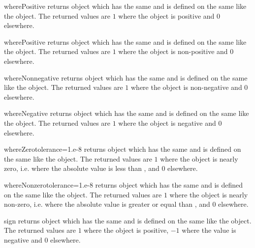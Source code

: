 \begin{methoddesc}[Data]{wherePositive}{}
returns \Data object which has the same \Shape and is defined on
the same \FunctionSpace like the object. The returned values are $1$
where the object is positive and $0$ elsewhere.
\end{methoddesc}

\begin{methoddesc}[Data]{wherePositive}{}
returns \Data object which has the same \Shape and is defined on
the same \FunctionSpace like the object. The returned values are $1$
where the object is non-positive and $0$ elsewhere.
\end{methoddesc}

\begin{methoddesc}[Data]{whereNonnegative}{}
returns \Data object which has the same \Shape and is defined on
the same \FunctionSpace like the object. The returned values are $1$
where the object is non-negative and $0$ elsewhere.
\end{methoddesc}

\begin{methoddesc}[Data]{whereNegative}{}
returns \Data object which has the same \Shape and is defined on
the same \FunctionSpace like the object. The returned values are $1$
where the object is negative and $0$ elsewhere.
\end{methoddesc}

\begin{methoddesc}[Data]{whereZero}{tolerance=1.e-8}
returns \Data object which has the same \Shape and is defined on
the same \FunctionSpace like the object. The returned values are $1$
where the object is nearly zero, i.e. where the absolute value is less
than , and $0$ elsewhere.
\end{methoddesc}

\begin{methoddesc}[Data]{whereNonzero}{tolerance=1.e-8}
returns \Data object which has the same \Shape and is defined on
the same \FunctionSpace like the object. The returned values are $1$
where the object is nearly non-zero, i.e. where the absolute value is
greater or equal than , and $0$ elsewhere.
\end{methoddesc}

\begin{methoddesc}[Data]{sign}{}
returns \Data object which has the same \Shape and is defined on
the same \FunctionSpace like the object. The returned values are $1$
where the object is positive, $-1$ where the value is negative and $0$ elsewhere.
\end{methoddesc}

